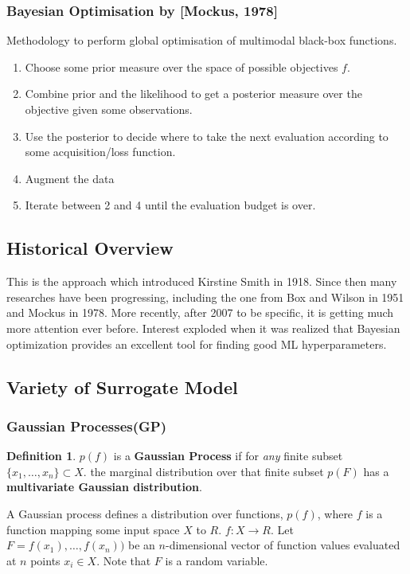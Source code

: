\documentclass{article}
\theoremstyle{definition}
\newtheorem{definition}{Definition}[section]
\begin{document}
\subsubsection{Bayesian Optimisation by [Mockus, 1978]}
Methodology to perform global optimisation of multimodal black-box functions.

\begin{enumerate}
    \item Choose some prior measure over the space of possible objectives $f$.
    \item Combine prior and the likelihood to get a posterior measure over the objective given some observations.
    \item Use the posterior to decide where to take the next evaluation according to some acquisition/loss function.
    \item Augment the data
    \item Iterate between 2 and 4 until the evaluation budget is over.
\end{enumerate}

\subsection{Historical Overview}
This is the approach which introduced Kirstine Smith in 1918. Since then many researches have been progressing, including the one from Box and Wilson in 1951 and Mockus in 1978. More recently, after 2007 to be specific, it is getting much more attention ever before. Interest exploded when it was realized that Bayesian optimization provides an excellent tool for finding good ML hyperparameters.

\subsection{Variety of Surrogate Model}
\subsubsection{Gaussian Processes(GP)}
\begin{definition}
$p(f)$ is a \textbf{Gaussian Process} if for \textit{any} finite subset $\{ x_1, \dots, x_n \} \subset X $. the marginal distribution over that finite subset $p(F)$ has a \textbf{multivariate Gaussian distribution}.
\end{definition}

A Gaussian process defines a distribution over functions, $p(f)$, where $f$ is a function mapping some input space $X$ to $R$. $f : X \rightarrow R$. Let $F = f(x_1), \dots, f(x_n))$ be an $n$-dimensional vector of function values evaluated at $n$ points $x_i \in X$. Note that $F$ is a random variable.
\end{document}
